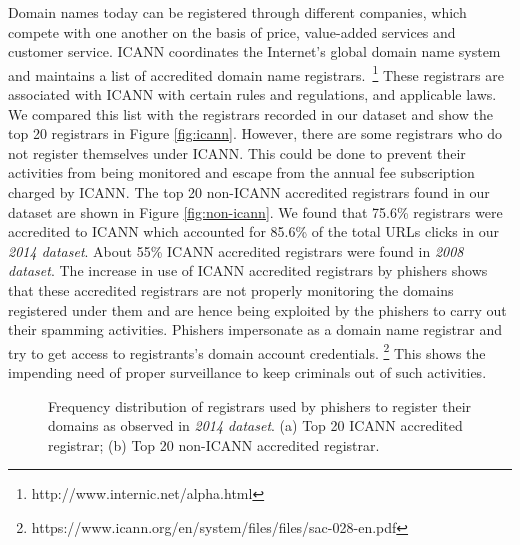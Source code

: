 \documentclass[conference]{IEEEtran}
\begin{document}
Domain names today can be registered through different companies, which compete with one another on the basis of price, value-added services and customer service. ICANN coordinates the Internet's global domain name system and maintains a list of accredited domain name registrars.~\footnote{http://www.internic.net/alpha.html} These registrars are associated with ICANN with certain rules and regulations, and applicable laws. We compared this list with the registrars recorded in our dataset and show the top 20 registrars in Figure \ref{fig:icann}. However, there are some registrars who do not register themselves under ICANN. This could be done to prevent their activities from being monitored and escape from the annual fee subscription charged by ICANN. The top 20 non-ICANN accredited registrars found in our dataset are shown in Figure \ref{fig:non-icann}. We found that 75.6\% registrars were accredited to ICANN which accounted for 85.6\% of the total URLs clicks in our \textit{2014 dataset}. About 55\% ICANN accredited registrars were found in \textit{2008 dataset}. The increase in use of ICANN accredited registrars by phishers shows that these accredited registrars are not properly monitoring the domains registered under them and are hence being exploited by the phishers to carry out their spamming activities. Phishers impersonate as a domain name registrar and try to get access to registrants's domain account credentials. \footnote{https://www.icann.org/en/system/files/files/sac-028-en.pdf} This shows the impending need of proper surveillance to keep criminals out of such activities.

\begin{figure*}[t]
\centering
{}
\hfil\hfil
{}
\caption{Frequency distribution of registrars used by phishers to register their domains as observed in \textit{2014 dataset}. (a) Top 20 ICANN accredited registrar; (b) Top 20 non-ICANN accredited registrar.}
\label{registrar}
\end{figure*}
\end{document}
